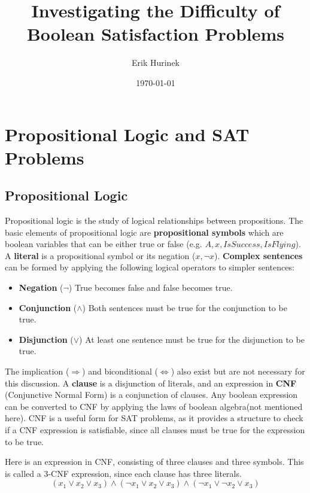 \documentclass{article}
\author{Erik Hurinek}
\title{Investigating the Difficulty of Boolean Satisfaction Problems}
\date{\today}
\begin{document}
    \maketitle

    \section{Propositional Logic and SAT Problems}

    \subsection{Propositional Logic}
    Propositional logic is the study of logical relationships between propositions.\supercite{sep-logic-propositional} The basic elements of propositional logic are \textbf{propositional symbols} which are boolean variables that can be either true or false (e.g. $A, x, IsSuccess, IsFlying$). A \textbf{literal} is a propositional symbol or its negation ($x, \neg x $). \textbf{Complex sentences} can be formed by applying the following logical operators to simpler sentences:  

    \begin{itemize}
        \item \textbf{Negation} ($\neg$) True becomes false and false becomes true.
        \item \textbf{Conjunction} ($\land$) Both sentences must be true for the conjunction to be true.
        \item \textbf{Disjunction} ($\lor$) At least one sentence must be true for the disjunction to be true.
    \end{itemize}

    The implication ($\Rightarrow$) and biconditional ($\Leftrightarrow$) also exist but are not necessary for this discussion. A \textbf{clause} is a disjunction of literals, and an expression in \textbf{CNF} (Conjunctive Normal Form) is a conjunction of clauses. Any boolean expression can be converted to CNF by applying the laws of boolean algebra\supercite{Norvig_2021}(not mentioned here). CNF is a useful form for SAT problems, as it provides a structure to check if a CNF expression is satisfiable, since all clauses must be true for the expression to be true.

    Here is an expression in CNF, consisting of three clauses and three symbols. This is called a 3-CNF expression, since each clause has three literals.
    \begin{equation*}
        (x_1 \lor x_2 \lor x_3) \land (\neg x_1 \lor x_2 \lor x_3) \land (\neg x_1 \lor \neg x_2 \lor x_3)
    \end{equation*}
\end{document}
